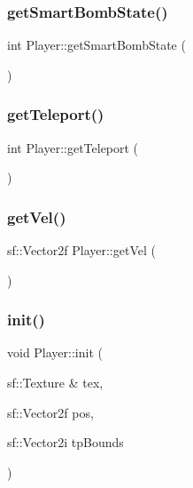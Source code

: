 \subsubsection{\texorpdfstring{get\+Smart\+Bomb\+State()}{getSmartBombState()}}
{\footnotesize\ttfamily int Player\+::get\+Smart\+Bomb\+State (\begin{DoxyParamCaption}{ }\end{DoxyParamCaption})}

\mbox{\label{class_player_a995b03fe2b8f0b47aa526c975a3b8254}} 
\subsubsection{\texorpdfstring{get\+Teleport()}{getTeleport()}}
{\footnotesize\ttfamily int Player\+::get\+Teleport (\begin{DoxyParamCaption}{ }\end{DoxyParamCaption})}

\mbox{\label{class_player_a0ec9b337a29a388ca7ce6dc9de93ca76}} 
\subsubsection{\texorpdfstring{get\+Vel()}{getVel()}}
{\footnotesize\ttfamily sf\+::\+Vector2f Player\+::get\+Vel (\begin{DoxyParamCaption}{ }\end{DoxyParamCaption})}

\mbox{\label{class_player_ad088063876ac0e5c3eb59fc7c4806929}} 
\subsubsection{\texorpdfstring{init()}{init()}}
{\footnotesize\ttfamily void Player\+::init (\begin{DoxyParamCaption}\item[{sf\+::\+Texture \&}]{tex,  }\item[{sf\+::\+Vector2f}]{pos,  }\item[{sf\+::\+Vector2i}]{tp\+Bounds }\end{DoxyParamCaption})}

